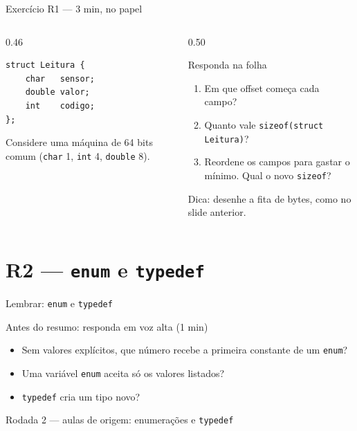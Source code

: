 \documentclass[aspectratio=169]{beamer}
\newcommand{\rodada}[4]{%
  \begin{frame}{Lembrar: #2}
    \begin{block}{Antes do resumo: responda em voz alta (1 min)}
      #4
    \end{block}
    \vfill
    {\small\textcolor{UFSGray}{Rodada #1 --- aulas de origem:} #3}
  \end{frame}}
\begin{document}
\begin{frame}[fragile]{Exercício R1 --- 3 min, no papel}
  \begin{columns}[T]
    \begin{column}{0.46\textwidth}
\begin{lstlisting}[style=numC]
struct Leitura {
    char   sensor;
    double valor;
    int    codigo;
};
\end{lstlisting}
      \scriptsize\textcolor{UFSGray}{Considere uma máquina de 64 bits
      comum (\texttt{char} 1, \texttt{int} 4, \texttt{double} 8).}
    \end{column}
    \begin{column}{0.50\textwidth}
      \begin{block}{Responda na folha}
        \begin{enumerate}
          \item[(a)] Em que offset começa cada campo?
          \item[(b)] Quanto vale \texttt{sizeof(struct Leitura)}?
          \item[(c)] Reordene os campos para gastar o mínimo. Qual o novo
            \texttt{sizeof}?
        \end{enumerate}
      \end{block}
      \small Dica: desenhe a fita de bytes, como no slide anterior.
    \end{column}
  \end{columns}
\end{frame}

\section{R2 --- \texttt{enum} e \texttt{typedef}}

\rodada{2}{\texttt{enum} e \texttt{typedef}}{enumerações e \texttt{typedef}}{
  \begin{itemize}
    \item Sem valores explícitos, que número recebe a primeira constante de
      um \texttt{enum}?
    \item Uma variável \texttt{enum} aceita só os valores listados?
    \item \texttt{typedef} cria um tipo novo?
  \end{itemize}}
\end{document}
